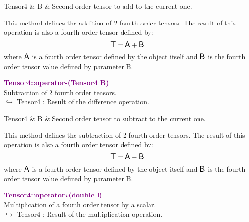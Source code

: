 \begin{tcolorbox}[width=\textwidth,myArgs,tabularx={ll|R}]
Tensor4 & B & Second order tensor to add to the current one.
\end{tcolorbox}

This method defines the addition of 2 fourth order tensors.
The result of this operation is also a fourth order tensor defined by:
\begin{equation*}
\mbox{\large\ensuremath{\mathsf{T}}} = \mbox{\large\ensuremath{\mathsf{A}}} + \mbox{\large\ensuremath{\mathsf{B}}}
\end{equation*}
where $\mbox{\large\ensuremath{\mathsf{A}}}$ is a fourth order tensor defined by the object itself and $\mbox{\large\ensuremath{\mathsf{B}}}$ is the fourth order tensor value defined by parameter B.

\textcolor{purple}{\textbf{Tensor4::operator-(Tensor4 B)}}\label{Tensor4::operator-(Tensor4 B)}\\
Subtraction of 2 fourth order tensors.\\ \hspace*{10mm}$\hookrightarrow$ Tensor4 : Result of the difference operation.

\begin{tcolorbox}[width=\textwidth,myArgs,tabularx={ll|R}]
Tensor4 & B & Second order tensor to subtract to the current one.
\end{tcolorbox}

This method defines the subtraction of 2 fourth order tensors.
The result of this operation is also a fourth order tensor defined by:
\begin{equation*}
\mbox{\large\ensuremath{\mathsf{T}}} = \mbox{\large\ensuremath{\mathsf{A}}} - \mbox{\large\ensuremath{\mathsf{B}}}
\end{equation*}
where $\mbox{\large\ensuremath{\mathsf{A}}}$ is a fourth order tensor defined by the object itself and $\mbox{\large\ensuremath{\mathsf{B}}}$ is the fourth order tensor value defined by parameter B.

\textcolor{purple}{\textbf{Tensor4::operator$\star$(double l)}}\label{Tensor4::operator*(double l)}\\
Multiplication of a fourth order tensor by a scalar.\\ \hspace*{10mm}$\hookrightarrow$ Tensor4 : Result of the multiplication operation.

